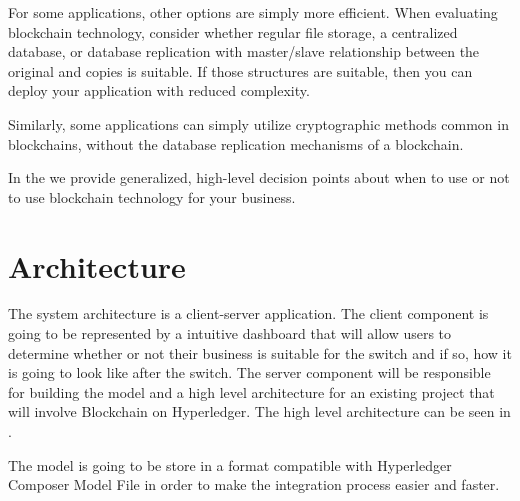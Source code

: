 For some applications, other options are simply more efficient. When evaluating blockchain technology, consider whether regular file storage, a centralized database, or database replication with master/slave relationship between the original and copies is suitable. If those structures are suitable, then you can deploy your application with reduced complexity. 

Similarly, some applications can simply utilize cryptographic methods common in blockchains, without the database replication mechanisms of a blockchain.

In the  we provide generalized, high-level decision points about when to use or not to use blockchain technology for your business.


\section{Architecture}
\label{sub-sec:chapter3-section2}
The system architecture is a client-server application. The client component is going to be represented by a intuitive dashboard that will allow users to determine whether or not their business is suitable for the switch and if so, how it is going to look like after the switch.
The server component will be responsible for building the model and a high level architecture for an existing project that will involve Blockchain on Hyperledger. 
The high level architecture can be seen in .

The model is going to be store in a format compatible with Hyperledger Composer Model File in order to make the integration process easier and faster.

